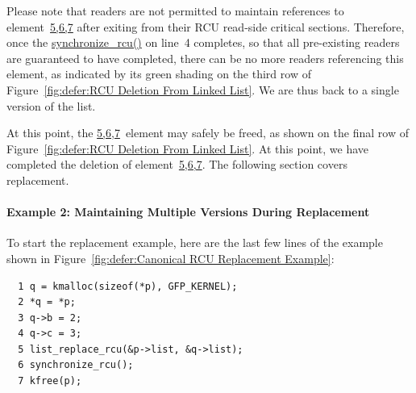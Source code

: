 Please note that readers are not permitted to maintain references to
element~\url{5,6,7} after exiting from their RCU read-side
critical sections.
Therefore,
once the \url{synchronize_rcu()} on
line~4 completes, so that all pre-existing readers are
guaranteed to have completed,
there can be no more readers referencing this
element, as indicated by its green shading on the third row of
Figure~\ref{fig:defer:RCU Deletion From Linked List}.
We are thus back to a single version of the list.

At this point, the \url{5,6,7}~element may safely be
freed, as shown on the final row of
Figure~\ref{fig:defer:RCU Deletion From Linked List}.
At this point, we have completed the deletion of
element~\url{5,6,7}.
The following section covers replacement.

\paragraph{Example 2: Maintaining Multiple Versions During Replacement}
\label{sec:defer:Example 2: Maintaining Multiple Versions During Replacement}

To start the replacement example,
here are the last few lines of the
example shown in
Figure~\ref{fig:defer:Canonical RCU Replacement Example}:

\vspace{5pt}
\begin{minipage}[t]{\columnwidth}
\begin{verbatim}
  1 q = kmalloc(sizeof(*p), GFP_KERNEL);
  2 *q = *p;
  3 q->b = 2;
  4 q->c = 3;
  5 list_replace_rcu(&p->list, &q->list);
  6 synchronize_rcu();
  7 kfree(p);
\end{verbatim}
\end{minipage}
\vspace{5pt}

